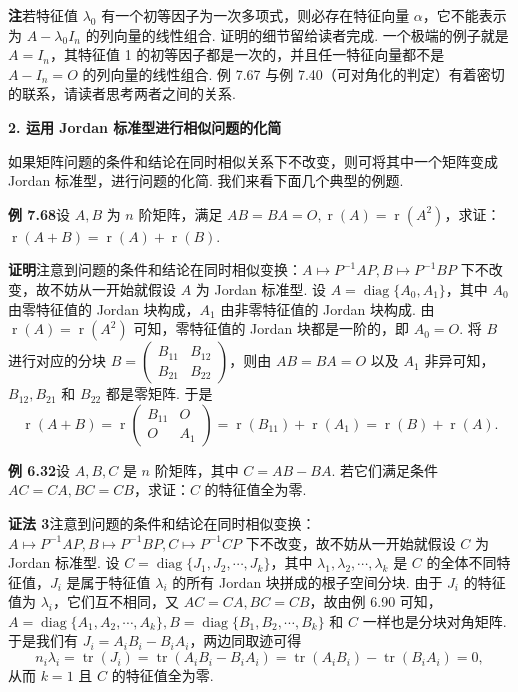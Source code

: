 \documentclass[UTF8,12pt,a4paper,fontset=fandol]{ctexart}
\begin{document}
\noindent\textbf{注}\quad 若特征值 $\lambda_0$ 有一个初等因子为一次多项式，则必存在特征向量 $\alpha$，它不能表示为 $A-\lambda_0I_n$ 的列向量的线性组合. 证明的细节留给读者完成. 一个极端的例子就是 $A=I_n$，其特征值 1 的初等因子都是一次的，并且任一特征向量都不是 $A-I_n=O$ 的列向量的线性组合. 例 7.67 与例 7.40（可对角化的判定）有着密切的联系，请读者思考两者之间的关系.

\noindent\textbf{2. 运用 Jordan 标准型进行相似问题的化简}

如果矩阵问题的条件和结论在同时相似关系下不改变，则可将其中一个矩阵变成 Jordan 标准型，进行问题的化简. 我们来看下面几个典型的例题.

\noindent\textbf{例 7.68}\quad 设 $A,B$ 为 $n$ 阶矩阵，满足 $AB=BA=O,\operatorname{r}(A)=\operatorname{r}(A^2)$，求证：$\operatorname{r}(A+B)=\operatorname{r}(A)+\operatorname{r}(B)$.

\noindent\textbf{证明}\quad 注意到问题的条件和结论在同时相似变换：$A\mapsto P^{-1}AP,B\mapsto P^{-1}BP$ 下不改变，故不妨从一开始就假设 $A$ 为 Jordan 标准型. 设 $A=\operatorname{diag}\{A_0,A_1\}$，其中 $A_0$ 由零特征值的 Jordan 块构成，$A_1$ 由非零特征值的 Jordan 块构成. 由 $\operatorname{r}(A)=\operatorname{r}(A^2)$ 可知，零特征值的 Jordan 块都是一阶的，即 $A_0=O$. 将 $B$ 进行对应的分块 $B=\left(\begin{array}{cc}B_{11}&B_{12}\\B_{21}&B_{22}\end{array}\right)$，则由 $AB=BA=O$ 以及 $A_1$ 非异可知，$B_{12},B_{21}$ 和 $B_{22}$ 都是零矩阵. 于是
\[
\operatorname{r}(A+B)=\operatorname{r}\left(\begin{array}{cc}B_{11}&O\\O&A_1\end{array}\right)=\operatorname{r}(B_{11})+\operatorname{r}(A_1)=\operatorname{r}(B)+\operatorname{r}(A).
\]

\noindent\textbf{例 6.32}\quad 设 $A,B,C$ 是 $n$ 阶矩阵，其中 $C=AB-BA$. 若它们满足条件 $AC=CA,BC=CB$，求证：$C$ 的特征值全为零.

\noindent\textbf{证法 3}\quad 注意到问题的条件和结论在同时相似变换：$A\mapsto P^{-1}AP,B\mapsto P^{-1}BP,C\mapsto P^{-1}CP$ 下不改变，故不妨从一开始就假设 $C$ 为 Jordan 标准型. 设 $C=\operatorname{diag}\{J_1,J_2,\cdots,J_k\}$，其中 $\lambda_1,\lambda_2,\cdots,\lambda_k$ 是 $C$ 的全体不同特征值，$J_i$ 是属于特征值 $\lambda_i$ 的所有 Jordan 块拼成的根子空间分块. 由于 $J_i$ 的特征值为 $\lambda_i$，它们互不相同，又 $AC=CA,BC=CB$，故由例 6.90 可知，$A=\operatorname{diag}\{A_1,A_2,\cdots,A_k\},B=\operatorname{diag}\{B_1,B_2,\cdots,B_k\}$ 和 $C$ 一样也是分块对角矩阵. 于是我们有 $J_i=A_iB_i-B_iA_i$，两边同取迹可得
\[
n_i\lambda_i=\operatorname{tr}(J_i)=\operatorname{tr}(A_iB_i-B_iA_i)=\operatorname{tr}(A_iB_i)-\operatorname{tr}(B_iA_i)=0,
\]
从而 $k=1$ 且 $C$ 的特征值全为零.
\end{document}
